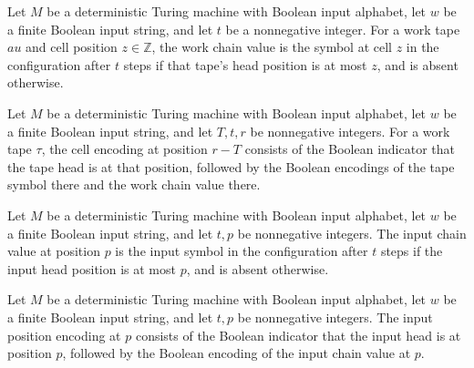 \begin{definition}
\label{Complexity.workChain}
\leanok
{}
Let $M$ be a deterministic Turing machine with Boolean input alphabet, let $w$ be a
finite Boolean input string, and let $t$ be a nonnegative integer. For a work tape $	au$
and cell position $z\in\mathbb Z$, the work chain value is the symbol at cell $z$ in the
configuration after $t$ steps if that tape's head position is at most $z$, and is absent
otherwise.
\end{definition}

\begin{definition}
\label{Complexity.cellExp}
\leanok
{}
Let $M$ be a deterministic Turing machine with Boolean input alphabet, let $w$ be a
finite Boolean input string, and let $T,t,r$ be nonnegative integers. For a work tape
$\tau$, the cell encoding at position $r-T$ consists of the Boolean indicator that the
tape head is at that position, followed by the Boolean encodings of the tape symbol
there and the work chain value there.
\end{definition}

\begin{definition}
\label{Complexity.inpChain}
\leanok
{}
Let $M$ be a deterministic Turing machine with Boolean input alphabet, let $w$ be a
finite Boolean input string, and let $t,p$ be nonnegative integers. The input chain
value at position $p$ is the input symbol in the configuration after $t$ steps if the
input head position is at most $p$, and is absent otherwise.
\end{definition}

\begin{definition}
\label{Complexity.inpExp}
\leanok
{}
Let $M$ be a deterministic Turing machine with Boolean input alphabet, let $w$ be a
finite Boolean input string, and let $t,p$ be nonnegative integers. The input position
encoding at $p$ consists of the Boolean indicator that the input head is at position
$p$, followed by the Boolean encoding of the input chain value at $p$.
\end{definition}

